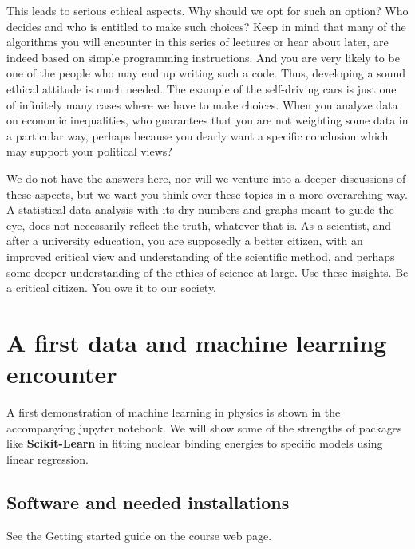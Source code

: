 \documentclass[%
oneside,                 %
final,                   %
10pt]{article}
\begin{document}
This leads to serious ethical aspects. Why should we
opt for such an option? Who decides and who is entitled to make such
choices? Keep in mind that many of the algorithms you will encounter in
this series of lectures or hear about later, are indeed based on
simple programming instructions. And you are very likely to be one of
the people who may end up writing such a code. Thus, developing a
sound ethical attitude is much needed. The example of the self-driving cars is
just one of infinitely many cases where we have to make choices. When
you analyze data on economic inequalities, who guarantees that you are
not weighting some data in a particular way, perhaps because you dearly want a
specific conclusion which may support your political views?

We do not have the answers here, nor will we venture into a deeper
discussions of these aspects, but we want you think over these topics
in a more overarching way.  A statistical data analysis with its dry
numbers and graphs meant to guide the eye, does not necessarily
reflect the truth, whatever that is.  As a scientist, and after a
university education, you are supposedly a better citizen, with an
improved critical view and understanding of the scientific method, and
perhaps some deeper understanding of the ethics of science at
large. Use these insights. Be a critical citizen. You owe it to our
society.




\section{A first data and machine learning encounter}

A first demonstration of machine learning in physics is shown in the accompanying jupyter notebook. We will show some of the strengths of packages like \textbf{Scikit-Learn} in fitting nuclear binding energies to specific models using linear regression.

\subsection{Software and needed installations}

See the Getting started guide on the course web page.




\end{document}
